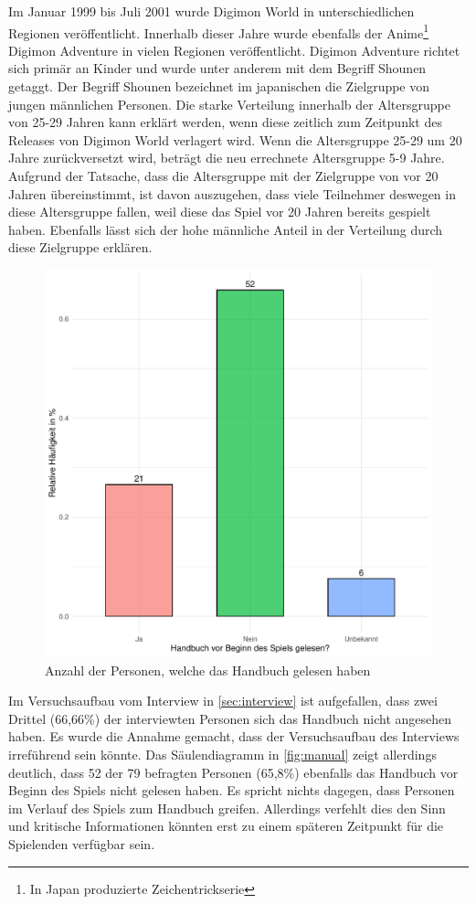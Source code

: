 Im Januar 1999 bis Juli 2001 wurde Digimon World in unterschiedlichen Regionen veröffentlicht. Innerhalb dieser Jahre wurde ebenfalls der Anime\footnote{In Japan produzierte Zeichentrickserie} Digimon Adventure in vielen Regionen veröffentlicht\cite{imdb-release}. Digimon Adventure richtet sich primär an Kinder\cite{mal-adventure} und wurde unter anderem mit dem Begriff Shounen getaggt\cite{anidb-adventure}. Der Begriff Shounen bezeichnet im japanischen die Zielgruppe von jungen männlichen Personen\cite{manga-brunner}. Die starke Verteilung innerhalb der Altersgruppe von 25-29 Jahren kann erklärt werden, wenn diese zeitlich zum Zeitpunkt des Releases von Digimon World verlagert wird. Wenn die Altersgruppe 25-29 um 20 Jahre zurückversetzt wird, beträgt die neu errechnete Altersgruppe 5-9 Jahre. Aufgrund der Tatsache, dass die Altersgruppe mit der Zielgruppe von vor 20 Jahren übereinstimmt, ist davon auszugehen, dass viele Teilnehmer deswegen in diese Altersgruppe fallen, weil diese das Spiel vor 20 Jahren bereits gespielt haben. Ebenfalls lässt sich der hohe männliche Anteil in der Verteilung durch diese Zielgruppe erklären. \\

\begin{figure}[H]
\centering
\includegraphics[width=0.65\columnwidth]{figures/plots/manual.pdf}
\caption{\label{fig:manual} Anzahl der Personen, welche das Handbuch gelesen haben}
\end{figure}

Im Versuchsaufbau vom Interview in \autoref{sec:interview} ist aufgefallen, dass zwei Drittel (66,66\%) der interviewten Personen sich das Handbuch nicht angesehen haben. Es wurde die Annahme gemacht, dass der Versuchsaufbau des Interviews irreführend sein könnte. Das Säulendiagramm in \autoref{fig:manual} zeigt allerdings deutlich, dass 52 der 79 befragten Personen (65,8\%) ebenfalls das Handbuch vor Beginn des Spiels nicht gelesen haben. Es spricht nichts dagegen, dass Personen im Verlauf des Spiels zum Handbuch greifen. Allerdings verfehlt dies den Sinn und kritische Informationen könnten erst zu einem späteren Zeitpunkt für die Spielenden verfügbar sein.\\

